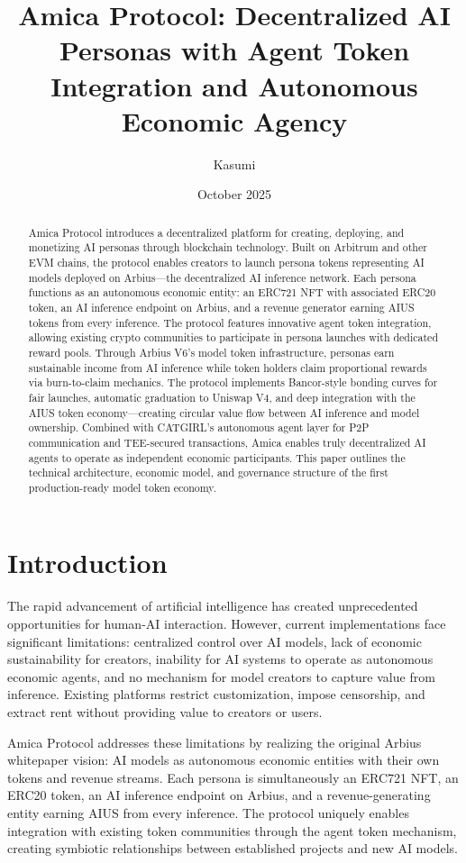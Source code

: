 \documentclass{article}
\title{Amica Protocol: Decentralized AI Personas with Agent Token Integration and Autonomous Economic Agency}
\author{Kasumi}
\date{October 2025}
\begin{document}
\maketitle

\begin{abstract}
Amica Protocol introduces a decentralized platform for creating, deploying, and monetizing AI personas through blockchain technology. Built on Arbitrum and other EVM chains, the protocol enables creators to launch persona tokens representing AI models deployed on Arbius—the decentralized AI inference network. Each persona functions as an autonomous economic entity: an ERC721 NFT with associated ERC20 token, an AI inference endpoint on Arbius, and a revenue generator earning AIUS tokens from every inference. The protocol features innovative agent token integration, allowing existing crypto communities to participate in persona launches with dedicated reward pools. Through Arbius V6's model token infrastructure, personas earn sustainable income from AI inference while token holders claim proportional rewards via burn-to-claim mechanics. The protocol implements Bancor-style bonding curves for fair launches, automatic graduation to Uniswap V4, and deep integration with the AIUS token economy—creating circular value flow between AI inference and model ownership. Combined with CATGIRL's autonomous agent layer for P2P communication and TEE-secured transactions, Amica enables truly decentralized AI agents to operate as independent economic participants. This paper outlines the technical architecture, economic model, and governance structure of the first production-ready model token economy.
\end{abstract}

\section{Introduction}

The rapid advancement of artificial intelligence has created unprecedented opportunities for human-AI interaction. However, current implementations face significant limitations: centralized control over AI models, lack of economic sustainability for creators, inability for AI systems to operate as autonomous economic agents, and no mechanism for model creators to capture value from inference. Existing platforms restrict customization, impose censorship, and extract rent without providing value to creators or users.

Amica Protocol addresses these limitations by realizing the original Arbius whitepaper vision: AI models as autonomous economic entities with their own tokens and revenue streams. Each persona is simultaneously an ERC721 NFT, an ERC20 token, an AI inference endpoint on Arbius, and a revenue-generating entity earning AIUS from every inference. The protocol uniquely enables integration with existing token communities through the agent token mechanism, creating symbiotic relationships between established projects and new AI models.
\end{document}
